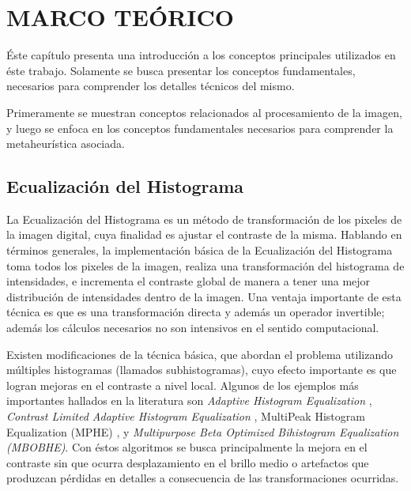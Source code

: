 \chapter{MARCO TEÓRICO}\label{sec:theorethical_framework}

Éste capítulo presenta una introducción a los conceptos principales utilizados en éste trabajo. Solamente se busca presentar los conceptos fundamentales, necesarios para comprender los detalles técnicos del mismo.

Primeramente se muestran conceptos relacionados al procesamiento de la imagen, y luego se enfoca en los conceptos fundamentales necesarios para comprender la metaheurística asociada.

\section{Ecualización del Histograma}

La Ecualización del Histograma es un método de transformación de los pixeles de la imagen digital, cuya finalidad es ajustar el contraste de la misma. Hablando en términos generales, la implementación básica de la Ecualización del Histograma toma todos los pixeles de la imagen, realiza una transformación del histograma de intensidades, e incrementa el contraste global de manera a tener una mejor distribución de intensidades dentro de la imagen. Una ventaja importante de esta técnica es que es una transformación directa y además un operador invertible; además los cálculos necesarios no son intensivos en el sentido computacional.

Existen modificaciones de la técnica básica, que abordan el problema utilizando múltiples histogramas (llamados subhistogramas), cuyo efecto importante es que logran mejoras en el contraste a nivel local. Algunos de los ejemplos más importantes hallados en la literatura son \textit{Adaptive Histogram Equalization} \cite{pizer1987adaptive}, \textit{Contrast Limited Adaptive Histogram Equalization} \cite{zuiderveld1994contrast}, MultiPeak Histogram Equalization (MPHE) \cite{743808}, y \textit{Multipurpose Beta Optimized Bihistogram Equalization (MBOBHE)}\cite{CPLX:CPLX21499}. Con éstos algoritmos se busca principalmente la mejora en el contraste sin que ocurra desplazamiento en el brillo medio o artefactos que produzcan pérdidas en detalles a consecuencia de las transformaciones ocurridas.

